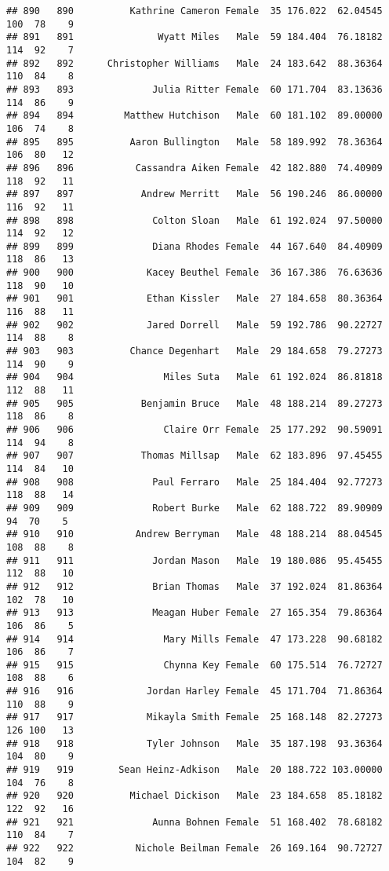 \documentclass[
]{article}
\begin{document}
\begin{verbatim}
## 890   890          Kathrine Cameron Female  35 176.022  62.04545 100  78    9
## 891   891               Wyatt Miles   Male  59 184.404  76.18182 114  92    7
## 892   892      Christopher Williams   Male  24 183.642  88.36364 110  84    8
## 893   893              Julia Ritter Female  60 171.704  83.13636 114  86    9
## 894   894         Matthew Hutchison   Male  60 181.102  89.00000 106  74    8
## 895   895          Aaron Bullington   Male  58 189.992  78.36364 106  80   12
## 896   896           Cassandra Aiken Female  42 182.880  74.40909 118  92   11
## 897   897            Andrew Merritt   Male  56 190.246  86.00000 116  92   11
## 898   898              Colton Sloan   Male  61 192.024  97.50000 114  92   12
## 899   899              Diana Rhodes Female  44 167.640  84.40909 118  86   13
## 900   900             Kacey Beuthel Female  36 167.386  76.63636 118  90   10
## 901   901             Ethan Kissler   Male  27 184.658  80.36364 116  88   11
## 902   902             Jared Dorrell   Male  59 192.786  90.22727 114  88    8
## 903   903          Chance Degenhart   Male  29 184.658  79.27273 114  90    9
## 904   904                Miles Suta   Male  61 192.024  86.81818 112  88   11
## 905   905            Benjamin Bruce   Male  48 188.214  89.27273 118  86    8
## 906   906                Claire Orr Female  25 177.292  90.59091 114  94    8
## 907   907            Thomas Millsap   Male  62 183.896  97.45455 114  84   10
## 908   908              Paul Ferraro   Male  25 184.404  92.77273 118  88   14
## 909   909              Robert Burke   Male  62 188.722  89.90909  94  70    5
## 910   910           Andrew Berryman   Male  48 188.214  88.04545 108  88    8
## 911   911              Jordan Mason   Male  19 180.086  95.45455 112  88   10
## 912   912              Brian Thomas   Male  37 192.024  81.86364 102  78   10
## 913   913              Meagan Huber Female  27 165.354  79.86364 106  86    5
## 914   914                Mary Mills Female  47 173.228  90.68182 106  86    7
## 915   915                Chynna Key Female  60 175.514  76.72727 108  88    6
## 916   916             Jordan Harley Female  45 171.704  71.86364 110  88    9
## 917   917             Mikayla Smith Female  25 168.148  82.27273 126 100   13
## 918   918             Tyler Johnson   Male  35 187.198  93.36364 104  80    9
## 919   919        Sean Heinz-Adkison   Male  20 188.722 103.00000 104  76    8
## 920   920          Michael Dickison   Male  23 184.658  85.18182 122  92   16
## 921   921              Aunna Bohnen Female  51 168.402  78.68182 110  84    7
## 922   922           Nichole Beilman Female  26 169.164  90.72727 104  82    9

\end{verbatim}
\end{document}
